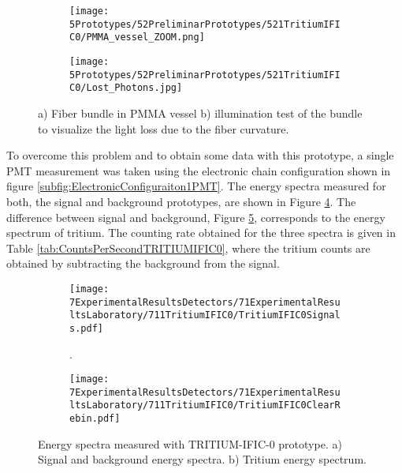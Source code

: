 \begin{figure}
\centering
    \begin{subfigure}[b]{0.45\textwidth}
    \centering
    \texttt{[image: 5Prototypes/52PreliminarPrototypes/521TritiumIFIC0/PMMA\_vessel\_ZOOM.png]}  
    \caption{\label{subfig:PMMAVesselToTestLostPhotons}}
    \end{subfigure}
    \hfill
    \begin{subfigure}[b]{0.45\textwidth}
    \centering
    \texttt{[image: 5Prototypes/52PreliminarPrototypes/521TritiumIFIC0/Lost\_Photons.jpg]}  
    \caption{\label{subfig:TestLostPhotons}}
    \end{subfigure}
 \caption{a) Fiber bundle in PMMA vessel b) illumination test of the bundle to visualize the light loss due to the fiber curvature.}
 \label{fig:TestLostPhotons}
\end{figure}

To overcome this problem and to obtain some data with this prototype, a single PMT measurement was taken using the electronic chain configuration shown in figure \ref{subfig:ElectronicConfiguraiton1PMT}. The energy spectra measured for both, the signal and background prototypes, are shown in Figure \ref{subfig:SignalBackgroundEnergySpectraTritiumIFIC0}. The difference between signal and background, Figure \ref{subfig:TritiumEnergySpectraTritiumIFIC0}, corresponds to the energy spectrum of tritium. The counting rate obtained for the three spectra is given in Table \ref{tab:CountsPerSecondTRITIUMIFIC0}, where the tritium counts are obtained by subtracting the background from the signal.


\begin{figure}
\centering
    \begin{subfigure}[b]{1\textwidth}
    \centering
    \texttt{[image: 7ExperimentalResultsDetectors/71ExperimentalResultsLaboratory/711TritiumIFIC0/TritiumIFIC0Signals.pdf]}  
    \caption{.\label{subfig:SignalBackgroundEnergySpectraTritiumIFIC0}}
    \end{subfigure}
    \hfill
    \begin{subfigure}[b]{1\textwidth}
    \centering
    \texttt{[image: 7ExperimentalResultsDetectors/71ExperimentalResultsLaboratory/711TritiumIFIC0/TritiumIFIC0ClearRebin.pdf]}  
    \caption{\label{subfig:TritiumEnergySpectraTritiumIFIC0}}
    \end{subfigure}
 \caption{Energy spectra measured with TRITIUM-IFIC-0 prototype. a) Signal and background energy spectra. b) Tritium energy spectrum.}
 \label{fig:EnergySpectraTRITIUMIFIC0}
\end{figure}

